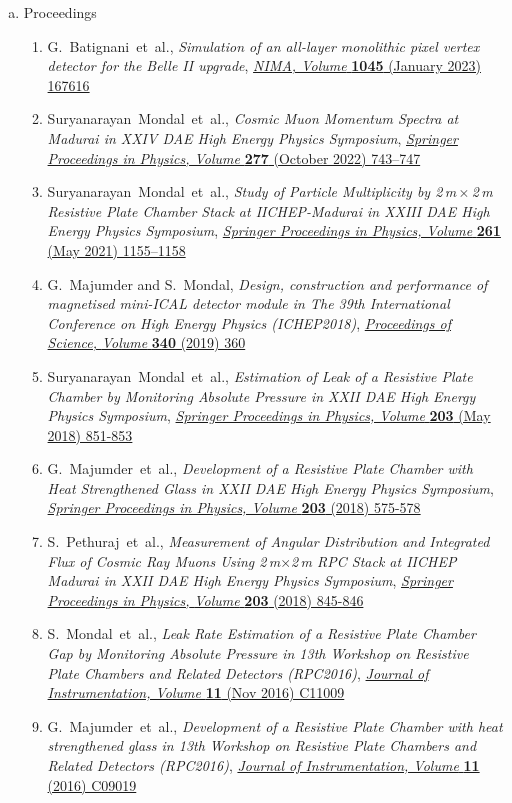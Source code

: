 \documentclass[12pt]{article}
\begin{document}
\begin{enumerate}[b.]
\item Proceedings
  \begin{enumerate}[1.]
  \item G.~Batignani~et~al., \emph{Simulation of an all-layer monolithic pixel vertex detector for the Belle II upgrade}, \href{https://doi.org/10.1016/j.nima.2022.167616}{\emph{NIMA, Volume } \textbf{1045} (January 2023) 167616}
  \item Suryanarayan~Mondal~et~al., \emph{Cosmic Muon Momentum Spectra at Madurai in XXIV DAE High Energy Physics Symposium}, \href{https://doi.org/10.1007/978-981-19-2354-8_134}{\emph{Springer Proceedings in Physics, Volume } \textbf{277} (October 2022) 743--747}
  \item Suryanarayan~Mondal~et~al., \emph{Study of Particle Multiplicity by 2\,m\,$\times$\,2\,m Resistive Plate Chamber Stack at IICHEP-Madurai in XXIII DAE High Energy Physics Symposium}, \href{https://doi.org/10.1007/978-981-33-4408-2_172}{\emph{Springer Proceedings in Physics, Volume } \textbf{261} (May 2021) 1155--1158}
  \item G.~Majumder and S.~Mondal, \emph{Design, construction and performance of magnetised mini-ICAL detector module in The 39th International Conference on High Energy Physics (ICHEP2018)}, \href{https://doi.org/10.22323/1.340.0360}{\emph{Proceedings of Science,} \textit{Volume} \textbf{340} (2019) 360}
  \item Suryanarayan~Mondal~et~al., \emph{Estimation of Leak of a Resistive Plate Chamber by Monitoring Absolute Pressure in XXII DAE High Energy Physics Symposium}, \href{https://doi.org/10.1007/978-3-319-73171-1_207}{\emph{Springer Proceedings in Physics, Volume } \textbf{203} (May 2018) 851-853}
  \item G.~Majumder~et~al., \emph{Development of a Resistive Plate Chamber with Heat Strengthened Glass in XXII DAE High Energy Physics Symposium}, \href{https://doi.org/10.1007/978-3-319-73171-1_135}{\emph{Springer Proceedings in Physics, Volume} \textbf{203} (2018) 575-578}
  \item S.~Pethuraj~et~al., \emph{Measurement of Angular Distribution and Integrated Flux of Cosmic Ray Muons Using 2\,m$\times$2\,m RPC Stack at IICHEP Madurai in XXII DAE High Energy Physics Symposium}, \href{https://doi.org/10.1007/978-3-319-73171-1_205}{\emph{Springer Proceedings in Physics,} \emph{Volume} \textbf{203} (2018) 845-846}
  \item S.~Mondal~et~al., \emph{Leak Rate Estimation of a Resistive Plate Chamber Gap by Monitoring Absolute Pressure in 13th Workshop on Resistive Plate Chambers and Related Detectors (RPC2016)}, \href{https://doi.org/10.1088/1748-0221/11/11/C11009}{\emph{Journal of Instrumentation, Volume } \textbf{11} (Nov 2016) C11009}
  \item  G.~Majumder~et~al., \emph{Development of a Resistive Plate Chamber with heat strengthened glass in 13th Workshop on Resistive Plate Chambers and Related Detectors (RPC2016)}, \href{https://doi.org/10.1088/1748-0221/11/09/C09019}{\emph{Journal of Instrumentation, Volume} \textbf{11} (2016) C09019}
  \end{enumerate}
\end{enumerate}
\end{document}
